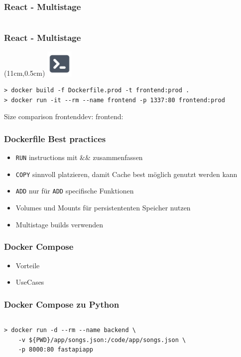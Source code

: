 \documentclass[22pt]{beamer}
\newcommand{\code}[1]{\colorbox{gray!10}{\texttt{#1}}}
\newcommand{\terminal}{
    \begin{textblock*}{1.3cm}(11cm,0.5cm) %
    \includegraphics[width=1.3cm]{Bilder/terminal.png}
    \end{textblock*}
}
\begin{document}
\begin{frame}[fragile]
    \frametitle{React - Multistage}
    \inputminted[fontsize=\footnotesize, frame=lines]{dockerfile}{../examples/React/Dockerfile.prod}
\end{frame}

\begin{frame}[fragile]
    \frametitle{React - Multistage}
    \terminal
\begin{verbatim}
> docker build -f Dockerfile.prod -t frontend:prod .
> docker run -it --rm --name frontend -p 1337:80 frontend:prod
\end{verbatim}

Size comparison
frontenddev:
frontend:

\end{frame}

\begin{frame}[t]
    \frametitle{Dockerfile Best practices}
    \begin{itemize}
        \item \code{RUN} instructions mit \&\& zusammenfassen
        \item \code{COPY} sinnvoll platzieren, damit Cache best möglich genutzt werden kann
        \item \code{ADD} nur für \code{ADD} specifische Funktionen
        \item Volumes und Mounts für persistententen Speicher nutzen
        \item Multistage builds verwenden
    \end{itemize} 
\end{frame}


\begin{frame}[t]
    \frametitle{Docker Compose}
    \begin{itemize}
        \item Vorteile
        \item UseCases
    \end{itemize} 
\end{frame}

\begin{frame}[fragile]
    \frametitle{Docker Compose zu Python}
    \inputminted[fontsize=\footnotesize, frame=lines]{dockerfile}{../examples/FastAPI/docker-compose.yml}
    \medskip
    \begin{verbatim}
> docker run -d --rm --name backend \
    -v ${PWD}/app/songs.json:/code/app/songs.json \
    -p 8000:80 fastapiapp 
        
    \end{verbatim}
\end{frame}
\end{document}
